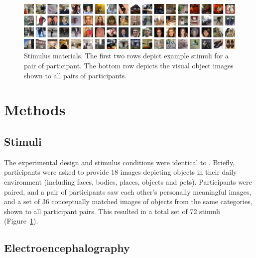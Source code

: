 \documentclass[10pt,letterpaper]{article}
\begin{document}
\begin{figure}[t]
\begin{center}
\includegraphics[width=\linewidth]{figures/figure1.png}
\end{center}
\caption{
  Stimulus materials. The first two rows depict example 
  stimuli for a pair of participant. The bottom row depicts the 
  visual object images shown to all pairs of participants.
} 
\label{fig1}
\end{figure}

\section{Methods}

\subsection{Stimuli}

The experimental design and stimulus conditions were identical to 
\cite{Charest2014-zn}. Briefly, participants were asked to provide 
18 images depicting objects in their daily environment (including 
faces, bodies, places, objects and pets). Participants were paired, 
and a pair of participants saw each other’s personally meaningful 
images, and a set of 36 conceptually matched images of objects from 
the same categories, shown to all participant pairs. This resulted 
in a total set of 72 stimuli (Figure~\ref{fig1}).


\subsection{Electroencephalography}
\end{document}
